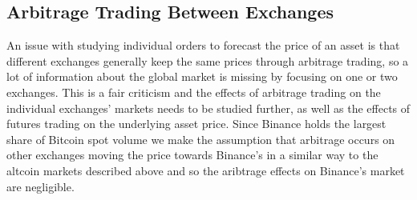 \documentclass[a4paper,10pt]{article}
\begin{document}
\subsection{Arbitrage Trading Between Exchanges}
An issue with studying individual orders to forecast the price of an asset is that different exchanges generally keep the same prices through arbitrage trading, so a lot of information about the global market is missing by focusing on one or two exchanges. This is a fair criticism and the effects of arbitrage trading on the individual exchanges' markets needs to be studied further, as well as the effects of futures trading on the underlying asset price. Since Binance holds the largest share of Bitcoin spot volume we make the assumption that arbitrage occurs on other exchanges moving the price towards Binance's in a similar way to the altcoin markets described above and so the aribtrage effects on Binance's market are negligible.

\medskip
\printbibliography
\end{document}
